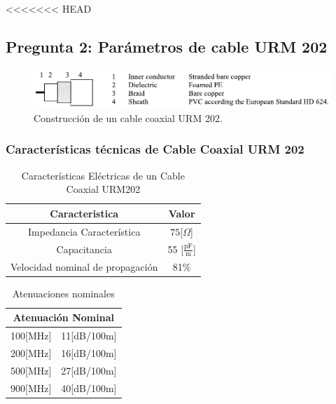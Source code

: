 \documentclass[11pt,onecolumn]{article}
\begin{document}
<<<<<<< HEAD
\newpage

\subsection{Pregunta 2: Parámetros de cable URM 202}

\begin{figure}[H]
\centering
\includegraphics[scale=1]{img/URM202.pdf}
\caption{Construcción de un cable coaxial URM 202.}
\label{urm202}
\end{figure}

\subsubsection{Características técnicas de Cable Coaxial URM 202}

\begin{multicols}{2}

\begin{table}[H]
\centering
\begin{tabular}{|c|c|}
\hline 
Caracteristica & Valor \\ 
\hline 
Impedancia Característica & $75$[$\Omega$] \\ 
\hline 
Capacitancia & 55 [$\frac{\mbox{pF}}{\mbox{m}}$] \\ 
\hline 
Velocidad nominal de propagación & 81\% \\ 
\hline 
\end{tabular} 
\caption{Características Eléctricas de un Cable Coaxial URM202}
\end{table}

\begin{table}[H]
\centering
\begin{tabular}{|c|c|}
\hline 
\multicolumn{2}{|c|}{Atenuación Nominal} \\ 
\hline 
100[MHz] & 11[dB/100m] \\ 
\hline 
200[MHz] & 16[dB/100m] \\ 
\hline 
500[MHz] & 27[dB/100m] \\ 
\hline 
900[MHz] & 40[dB/100m] \\ 
\hline 
\end{tabular} 
\caption{Atenuaciones nominales}
\label{aten}
\end{table}

\end{multicols}
\end{document}
